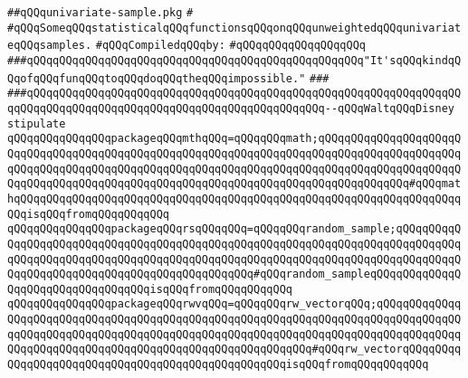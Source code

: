 \label{src/lib/src/univariate-sample.pkg}
\verb|##qQQqunivariate-sample.pkg|\newline
\verb|#|\newline
\verb|#qQQqSomeqQQqstatisticalqQQqfunctionsqQQqonqQQqunweightedqQQqunivariateqQQqsamples.|\newline
\newline
\verb|#qQQqCompiledqQQqby:|\newline
\verb|#qQQqqQQqqQQqqQQqqQQq|\newline
\newline
\newline
\newline
\verb|###qQQqqQQqqQQqqQQqqQQqqQQqqQQqqQQqqQQqqQQqqQQqqQQqqQQq"It'sqQQqkindqQQqofqQQqfunqQQqtoqQQqdoqQQqtheqQQqimpossible."|\newline
\verb|###|\newline
\verb|###qQQqqQQqqQQqqQQqqQQqqQQqqQQqqQQqqQQqqQQqqQQqqQQqqQQqqQQqqQQqqQQqqQQqqQQqqQQqqQQqqQQqqQQqqQQqqQQqqQQqqQQqqQQqqQQqqQQq--qQQqWaltqQQqDisney|\newline
\newline
\newline
\newline
\verb|stipulate|\newline
\verb|qQQqqQQqqQQqqQQqpackageqQQqmthqQQq=qQQqqQQqmath;qQQqqQQqqQQqqQQqqQQqqQQqqQQqqQQqqQQqqQQqqQQqqQQqqQQqqQQqqQQqqQQqqQQqqQQqqQQqqQQqqQQqqQQqqQQqqQQqqQQqqQQqqQQqqQQqqQQqqQQqqQQqqQQqqQQqqQQqqQQqqQQqqQQqqQQqqQQqqQQqqQQqqQQqqQQqqQQqqQQqqQQqqQQqqQQqqQQqqQQqqQQqqQQqqQQqqQQqqQQqqQQq#qQQqmathqQQqqQQqqQQqqQQqqQQqqQQqqQQqqQQqqQQqqQQqqQQqqQQqqQQqqQQqqQQqqQQqqQQqqQQqisqQQqfromqQQqqQQqqQQq|\newline
\verb|qQQqqQQqqQQqqQQqpackageqQQqrsqQQqqQQq=qQQqqQQqrandom_sample;qQQqqQQqqQQqqQQqqQQqqQQqqQQqqQQqqQQqqQQqqQQqqQQqqQQqqQQqqQQqqQQqqQQqqQQqqQQqqQQqqQQqqQQqqQQqqQQqqQQqqQQqqQQqqQQqqQQqqQQqqQQqqQQqqQQqqQQqqQQqqQQqqQQqqQQqqQQqqQQqqQQqqQQqqQQqqQQqqQQqqQQqqQQq#qQQqrandom_sampleqQQqqQQqqQQqqQQqqQQqqQQqqQQqqQQqqQQqisqQQqfromqQQqqQQqqQQq|\newline
\verb|qQQqqQQqqQQqqQQqpackageqQQqrwvqQQq=qQQqqQQqrw_vectorqQQq;qQQqqQQqqQQqqQQqqQQqqQQqqQQqqQQqqQQqqQQqqQQqqQQqqQQqqQQqqQQqqQQqqQQqqQQqqQQqqQQqqQQqqQQqqQQqqQQqqQQqqQQqqQQqqQQqqQQqqQQqqQQqqQQqqQQqqQQqqQQqqQQqqQQqqQQqqQQqqQQqqQQqqQQqqQQqqQQqqQQqqQQqqQQqqQQqqQQqqQQq#qQQqrw_vectorqQQqqQQqqQQqqQQqqQQqqQQqqQQqqQQqqQQqqQQqqQQqqQQqqQQqisqQQqfromqQQqqQQqqQQq|\newline
